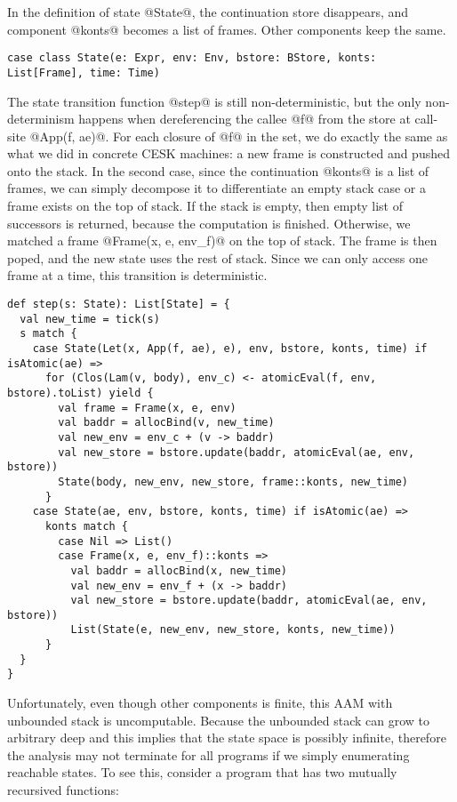 \documentclass[acmsmall,review,anonymous]{acmart}\settopmatter{printfolios=true,printccs=false,printacmref=false}
\begin{document}
In the definition of state @State@, the continuation store disappears, and
component @konts@ becomes a list of frames. Other components keep the same.

\begin{lstlisting}
case class State(e: Expr, env: Env, bstore: BStore, konts: List[Frame], time: Time)
\end{lstlisting}

The state transition function @step@ is still non-deterministic, but
the only non-determinism happens when dereferencing the callee @f@ 
from the store at call-site @App(f, ae)@. 
For each closure of @f@ in the set, we do exactly
the same as what we did in concrete CESK machines: a new frame is constructed
and pushed onto the stack.
In the second case, since the continuation @konts@ is a list of 
frames, we can simply decompose it to differentiate an empty stack case
or a frame exists on the top of stack. 
If the stack is empty, then empty list of successors is returned, 
because the computation is finished.
Otherwise, we matched a frame @Frame(x, e, env_f)@ on the top of stack.
The frame is then poped, and the new state uses the rest of stack.
Since we can only access one frame at a time, this transition is deterministic.

\begin{lstlisting}
def step(s: State): List[State] = {
  val new_time = tick(s)
  s match {
    case State(Let(x, App(f, ae), e), env, bstore, konts, time) if isAtomic(ae) =>
      for (Clos(Lam(v, body), env_c) <- atomicEval(f, env, bstore).toList) yield {
        val frame = Frame(x, e, env)
        val baddr = allocBind(v, new_time)
        val new_env = env_c + (v -> baddr)
        val new_store = bstore.update(baddr, atomicEval(ae, env, bstore))
        State(body, new_env, new_store, frame::konts, new_time)
      }
    case State(ae, env, bstore, konts, time) if isAtomic(ae) =>
      konts match {
        case Nil => List()
        case Frame(x, e, env_f)::konts =>
          val baddr = allocBind(x, new_time)
          val new_env = env_f + (x -> baddr)
          val new_store = bstore.update(baddr, atomicEval(ae, env, bstore))
          List(State(e, new_env, new_store, konts, new_time))
      }
  }
}
\end{lstlisting}

Unfortunately, even though other components is finite, this AAM with unbounded stack is uncomputable. 
Because the unbounded stack can grow to arbitrary deep and this implies that the state space is possibly 
infinite, therefore the analysis may not terminate for all programs if we simply enumerating 
reachable states.
To see this, consider a program that has two mutually recursived functions:
\end{document}
